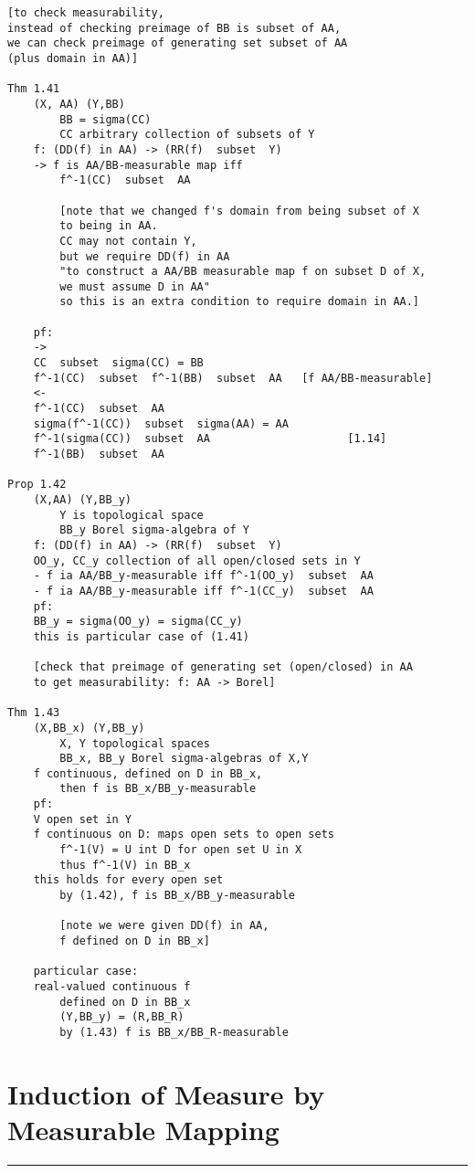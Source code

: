 \documentclass{article}
\begin{document}
\begin{flushleft}
\begin{verbatim}
[to check measurability, 
instead of checking preimage of BB is subset of AA,
we can check preimage of generating set subset of AA 
(plus domain in AA)]

Thm 1.41 
    (X, AA) (Y,BB) 
        BB = sigma(CC)
        CC arbitrary collection of subsets of Y
    f: (DD(f) in AA) -> (RR(f)  subset  Y)
    -> f is AA/BB-measurable map iff 
        f^-1(CC)  subset  AA 

        [note that we changed f's domain from being subset of X 
        to being in AA.
        CC may not contain Y,
        but we require DD(f) in AA 
        "to construct a AA/BB measurable map f on subset D of X,
        we must assume D in AA"
        so this is an extra condition to require domain in AA.]
    
    pf:
    ->
    CC  subset  sigma(CC) = BB 
    f^-1(CC)  subset  f^-1(BB)  subset  AA   [f AA/BB-measurable]
    <- 
    f^-1(CC)  subset  AA 
    sigma(f^-1(CC))  subset  sigma(AA) = AA 
    f^-1(sigma(CC))  subset  AA                     [1.14]
    f^-1(BB)  subset  AA 

Prop 1.42
    (X,AA) (Y,BB_y) 
        Y is topological space
        BB_y Borel sigma-algebra of Y 
    f: (DD(f) in AA) -> (RR(f)  subset  Y)
    OO_y, CC_y collection of all open/closed sets in Y 
    - f ia AA/BB_y-measurable iff f^-1(OO_y)  subset  AA 
    - f ia AA/BB_y-measurable iff f^-1(CC_y)  subset  AA 
    pf:
    BB_y = sigma(OO_y) = sigma(CC_y)
    this is particular case of (1.41)

    [check that preimage of generating set (open/closed) in AA 
    to get measurability: f: AA -> Borel]
    
Thm 1.43
    (X,BB_x) (Y,BB_y)
        X, Y topological spaces 
        BB_x, BB_y Borel sigma-algebras of X,Y
    f continuous, defined on D in BB_x, 
        then f is BB_x/BB_y-measurable 
    pf:
    V open set in Y
    f continuous on D: maps open sets to open sets
        f^-1(V) = U int D for open set U in X
        thus f^-1(V) in BB_x
    this holds for every open set
        by (1.42), f is BB_x/BB_y-measurable 

        [note we were given DD(f) in AA,
        f defined on D in BB_x]

    particular case:
    real-valued continuous f 
        defined on D in BB_x 
        (Y,BB_y) = (R,BB_R) 
        by (1.43) f is BB_x/BB_R-measurable 
\end{verbatim}

\section*{Induction of Measure by Measurable Mapping}
\bigbreak
\hrule
\bigbreak


\end{flushleft}
\end{document}

